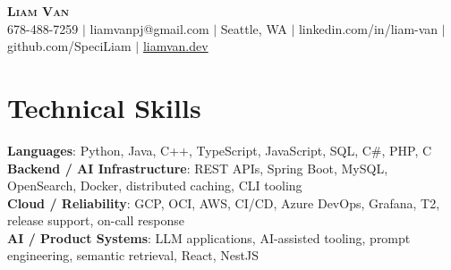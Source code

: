 \documentclass[letterpaper,11pt]{article}
\begin{document}

%
\begin{center}
    \textbf{\Huge \scshape Liam Van} \\ \vspace{1pt}
    \small 678-488-7259 $|$ \small {liamvanpj@gmail.com} $|$ Seattle, WA
 {{$|$ linkedin.com/in/liam-van} {$|$ github.com/SpeciLiam} {$|$ \href{https://liamvan.dev}{liamvan.dev}}}

\end{center}

\section{Technical Skills}
 \begin{itemize}[leftmargin=0.15in, label={}]
    \small{\item{
     \textbf{Languages}{: Python, Java, C++, TypeScript, JavaScript, SQL, C\#, PHP, C} \\
     \textbf{Backend / AI Infrastructure}{: REST APIs, Spring Boot, MySQL, OpenSearch, Docker, distributed caching, CLI tooling} \\
     \textbf{Cloud / Reliability}{: GCP, OCI, AWS, CI/CD, Azure DevOps, Grafana, T2, release support, on-call response} \\
     \textbf{AI / Product Systems}{: LLM applications, AI-assisted tooling, prompt engineering, semantic retrieval, React, NestJS} \\
    }}
 \end{itemize}
%

\end{document}

